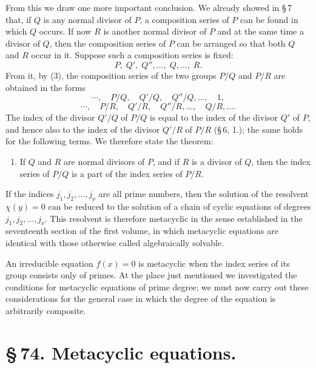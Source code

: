 \documentclass[11pt]{article}
\begin{document}
From this we draw one more important conclusion. We already showed in \S\,7 that, if $Q$ is any normal divisor of $P$, a composition series of $P$ can be found in which $Q$ occurs. If now $R$ is another normal divisor of $P$ and at the same time a divisor of $Q$, then the composition series of $P$ can be arranged so that both $Q$ and $R$ occur in it. Suppose such a composition series is fixed:
\begin{equation}
 P,\;Q',\;Q'',\ldots,\;Q,\ldots,\;R.
 \tag{4}
\end{equation}
From it, by (3), the composition series of the two groups $P/Q$ and $P/R$ are obtained in the forms
\begin{equation}
 \cdots,\quad P/Q,\quad Q'/Q,\quad Q''/Q,\ldots,\quad 1,
 \tag{5}
\end{equation}
\begin{equation}
 \cdots,\quad P/R,\quad Q'/R,\quad Q''/R,\ldots,\quad Q/R,\ldots .
 \tag{6}
\end{equation}
The index of the divisor $Q'/Q$ of $P/Q$ is equal to the index of the divisor $Q'$ of $P$, and hence also to the index of the divisor $Q'/R$ of $P/R$ (\S\,6, 1.); the same holds for the following terms. We therefore state the theorem:

\begin{enumerate}[label=\arabic*.,leftmargin=2.6em,start=3]
\item If $Q$ and $R$ are normal divisors of $P$, and if $R$ is a divisor of $Q$, then the index series of $P/Q$ is a part of the index series of $P/R$.
\end{enumerate}

If the indices $j_1,j_2,\ldots,j_\nu$ are all prime numbers, then the solution of the resolvent $\chi(y)=0$ can be reduced to the solution of a chain of cyclic equations of degrees $j_1,j_2,\ldots,j_\nu$. This resolvent is therefore metacyclic in the sense established in the seventeenth section of the first volume, in which metacyclic equations are identical with those otherwise called algebraically solvable.

An irreducible equation $f(x)=0$ is metacyclic when the index series of its group consists only of primes. At the place just mentioned we investigated the conditions for metacyclic equations of prime degree; we must now carry out these considerations for the general case in which the degree of the equation is arbitrarily composite.

\section*{\S\,74. Metacyclic equations.}
\end{document}
